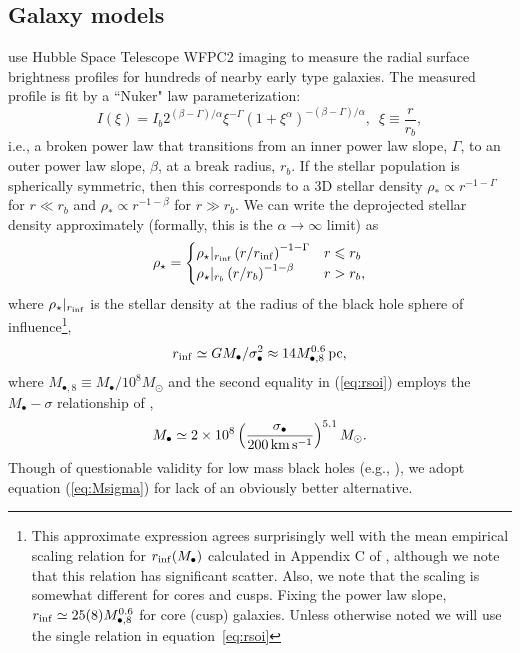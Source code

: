 \documentclass[usenatbib,fleqn]{mn2e}
\newcommand{\rb}{r_b}
\newcommand{\rhostar}{\rho_*}
\newcommand{\Mbh}[1][]{M_{\bullet#1}}
\newcommand{\Mbheight}{M_{\bullet,8}}
\newcommand{\rinf}{r_{\rm inf}}
\begin{document}
\subsection{Galaxy models}
\label{sec:gal_model}
\citet{LauerFaber+:2007a} use Hubble Space Telescope WFPC2 imaging to
measure the radial surface brightness profiles for hundreds of nearby
early type galaxies. The measured profile is fit by a ``Nuker" law parameterization:
\begin{equation}
  I(\xi)=I_b 2^{(\beta-\Gamma)/\alpha} \xi^{-\Gamma} (1+\xi^\alpha)^{-(\beta-\Gamma)/\alpha}, \,\,\,\xi\equiv\frac{r}{r_b},
\end{equation}
i.e., a broken power law that transitions from an inner power law
slope, $\Gamma$, to an outer power law slope, $\beta$, at a break
radius, $\rb$.  If the stellar population is spherically symmetric,
then this corresponds to a 3D stellar density $\rhostar \propto
r^{-1-\Gamma}$ for $r \ll \rb$ and $\rhostar\propto r^{-1-\beta}$ for
$r \gg \rb$.  We can write the deprojected stellar density
approximately (formally, this is the $\alpha \rightarrow \infty$
limit) as
\begin{align}
\rho_\star = 
\begin{cases}
\rho_\star|_{\rinf} \left(r/\rinf\right)^{-1-\Gamma} & r \leq r_b\\
\rho_\star|_{r_b} \left(r/r_b\right)^{-1-\beta} & r > r_b,
\label{eq:rhostar}
\end{cases}
\end{align}
where $\rho_\star|_{\rinf}$ is the stellar density at the radius of
the black hole sphere of influence\footnote{This approximate
  expression agrees surprisingly well with the mean empirical scaling
  relation for $r_{\rm inf}(M_\bullet)$ calculated in Appendix C of
  \citet{Stone&Metzger15}, although we note that this relation has
  significant scatter. Also, we note that the  scaling is somewhat
  different for cores and cusps. Fixing the power law slope,
  $\rinf\simeq 25 (8) \Mbheight^{0.6}$ for core (cusp)
  galaxies. Unless otherwise noted we will use the single relation in
  equation~\eqref{eq:rsoi}},
\begin{equation}
  \rinf \simeq G \Mbh/\sigma_{\bullet}^2 \approx 14 M_{\bullet,8}^{0.6}\,{\rm pc},
\label{eq:rsoi}
\end{equation}
where $M_{\bullet,8} \equiv M_{\bullet}/10^{8}M_{\odot}$ and the
second equality in (\ref{eq:rsoi}) employs the $\Mbh-\sigma$
relationship of \citet{McConnellMa+:2011a},
 \begin{align}
M_{\bullet} \simeq 2\times 10^{8}\left(\frac{\sigma_{\bullet}}{200\,{\rm
      km\,s^{-1}}}\right)^{5.1}M_{\odot}.
\label{eq:Msigma}
\end{align}
Though of questionable validity for low mass black holes (e.g.,
\citealt{Greene+2010, Kormendy+2013}), we adopt equation
(\ref{eq:Msigma}) for lack of an obviously better alternative.
\end{document}
